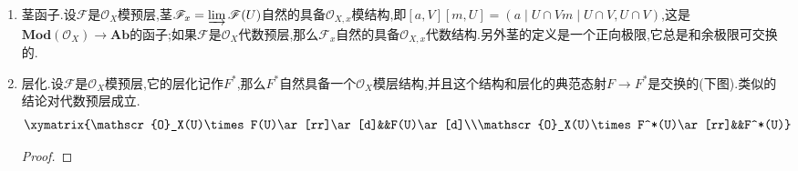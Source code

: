 \begin{enumerate}
	\item 茎函子.设$\mathscr{F}$是$\mathscr{O}_X$模预层,茎$\mathscr{F}_x=\varinjlim\mathscr{F}(U)$自然的具备$\mathscr{O}_{X,x}$模结构,即$[a,V][m,U]=(a\mid U\cap V m\mid U\cap V,U\cap V)$,这是$\textbf{Mod}(\mathscr{O}_X)\to\textbf{Ab}$的函子;如果$\mathscr{F}$是$\mathscr{O}_X$代数预层,那么$\mathscr{F}_x$自然的具备$\mathscr{O}_{X,x}$代数结构.另外茎的定义是一个正向极限,它总是和余极限可交换的.
	\item 层化.设$\mathscr{F}$是$\mathscr{O}_X$模预层,它的层化记作$F^*$,那么$F^*$自然具备一个$\mathscr{O}_X$模层结构,并且这个结构和层化的典范态射$F\to F^*$是交换的(下图).类似的结论对代数预层成立.
	$$\xymatrix{\mathscr{O}_X(U)\times F(U)\ar[rr]\ar[d]&&F(U)\ar[d]\\\mathscr{O}_X(U)\times F^*(U)\ar[rr]&&F^*(U)}$$
	\begin{proof}
		

\end{proof}
\end{enumerate}

